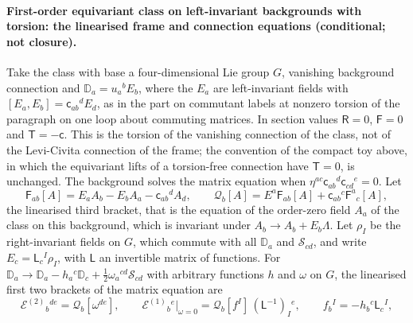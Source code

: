 \paragraph{First-order equivariant class on left-invariant backgrounds with torsion: the linearised frame and connection equations (conditional; not closure).}
Take the class with base a four-dimensional Lie group \(G\), vanishing background connection and \(\mathbb D_a=u_a{}^bE_b\), where the \(E_a\) are left-invariant fields with \([E_a,E_b]=\mathsf c_{ab}{}^dE_d\), as in the part on commutant labels at nonzero torsion of the paragraph on one loop about commuting matrices. In section values \(\mathsf R=0\), \(\mathsf F=0\) and \(\mathsf T=-\mathsf c\). This is the torsion of the vanishing connection of the class, not of the Levi-Civita connection of the frame; the convention of the compact toy above, in which the equivariant lifts of a torsion-free connection have \(\mathsf T=0\), is unchanged. The background solves the matrix equation when \(\eta^{ac}\mathsf c_{ab}{}^d\mathsf c_{cd}{}^e=0\). Let
\[
\mathsf F_{ab}[A]=E_aA_b-E_bA_a-\mathsf c_{ab}{}^dA_d,\qquad
\mathcal Q_b[A]=E^a\mathsf F_{ab}[A]+\mathsf c_{ab}{}^c\mathsf F^a{}_c[A],
\]
the linearised third bracket, that is the equation of the order-zero field \(A_a\) of the class on this background, which is invariant under \(A_b\to A_b+E_b\Lambda\). Let \(\rho_I\) be the right-invariant fields on \(G\), which commute with all \(\mathbb D_a\) and \(\mathcal S_{cd}\), and write \(E_c=\mathsf L_c{}^I\rho_I\), with \(\mathsf L\) an invertible matrix of functions. For \(\mathbb D_a\to\mathbb D_a-h_a{}^c\mathbb D_c+\tfrac12\omega_a{}^{cd}\mathcal S_{cd}\) with arbitrary functions \(h\) and \(\omega\) on \(G\), the linearised first two brackets of the matrix equation are
\[
\mathcal E^{(2)}{}_b{}^{de}=\mathcal Q_b[\omega^{de}],\qquad
\mathcal E^{(1)}{}_b{}^e\big|_{\omega=0}=\mathcal Q_b[f^I]\,(\mathsf L^{-1})_I{}^e,\qquad
f_b{}^I=-h_b{}^c\mathsf L_c{}^I,
\]
